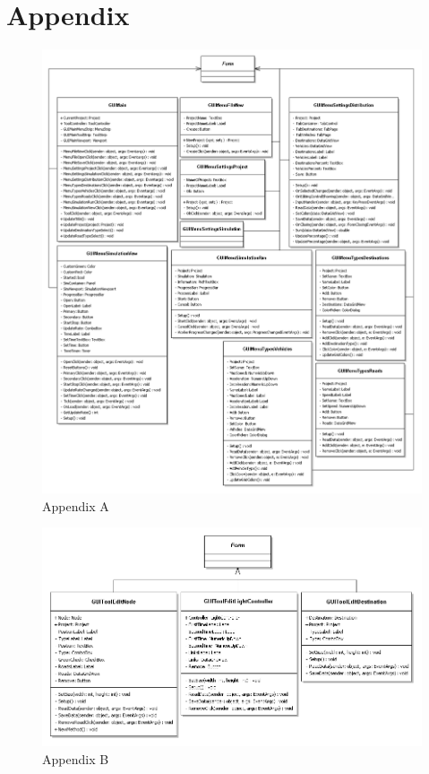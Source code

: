 \appendix
\chapter{Appendix}\label{[CHAPTER] Appendix}

\begin{figure}[H]
\centering
\includegraphics[width=\textwidth,height=\textheight,keepaspectratio]{Pictures/Klassediagram/GUI}
\caption{Appendix A}\label{AppendixA}
\end{figure}

\begin{figure}[H]
\centering
\includegraphics[width=\textwidth,height=\textheight,keepaspectratio]{Pictures/Klassediagram/GUIEdit}
\caption{Appendix B}\label{AppendixB}
\end{figure}


